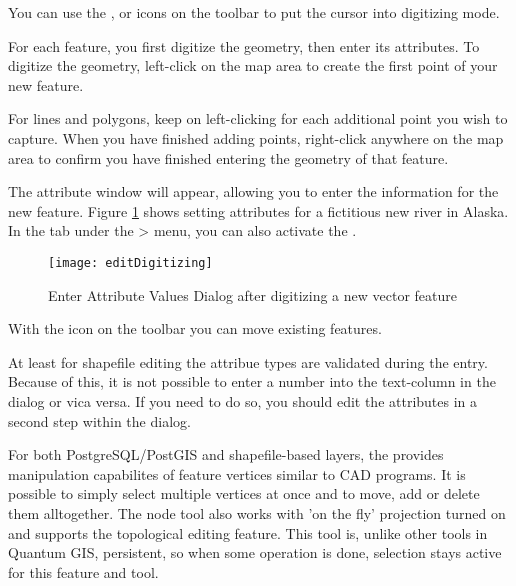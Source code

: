 You can use the ,
 or
 icons on the toolbar to
put the \qg cursor into digitizing mode.  

For each feature, you first digitize the geometry, then enter its attributes.
To digitize the geometry, left-click on the map area to create the first
point of your new feature.

For lines and polygons, keep on left-clicking for each additional
point you wish to capture.  When you have finished adding points,
right-click anywhere on the map area to confirm you have finished entering
the geometry of that feature.

The attribute window will appear, allowing you to enter the information for
the new feature. Figure \ref{fig:vector_digitising} shows setting attributes
for a fictitious new river in Alaska. In the  tab under the
 > menu, you can also activate the 
.

\begin{figure}[ht]
   \centering
   \texttt{[image: editDigitizing]}
   \caption{Enter Attribute Values Dialog after digitizing a new vector feature \nixcaption}\label{fig:vector_digitising}
 \end{figure}

With the  icon on the toolbar
you can move existing features.

\begin{Tip}\caption{\textsc{Attribute Value Types}}
At least for shapefile editing the attribue types are validated during the
entry. Because of this, it is not possible to enter a number into the text-column in
the dialog  or vica versa. If you need to do so,
you should edit the attributes in a second step within the  dialog.
\end{Tip}


For both PostgreSQL/PostGIS and shapefile-based layers, the 
 provides manipulation capabilites
of feature vertices similar to CAD programs. It is possible to simply select
multiple vertices at once and to move, add or delete them alltogether. The node
tool also works with 'on the fly' projection turned on and supports
the topological editing feature. This tool is, unlike other tools in Quantum GIS,
persistent, so when some operation is done, selection stays active for this
feature and tool.

